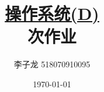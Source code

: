 \documentclass[12pt,a4paper]{article}
\newenvironment{problems}{\begin{list}{}{\renewcommand{\makelabel}[1]{\textbf{##1}\hfil}}}{\end{list}}
\providecommand{\sol}{\textbf{解}.~}
\begin{document}
\title{\normalsize \underline{操作系统(D)}\\ 次作业}
\author{李子龙 518070910095}
\date{\today}
\maketitle

\begin{problems}
    
    


        
        
        


\end{problems}
\end{document}
